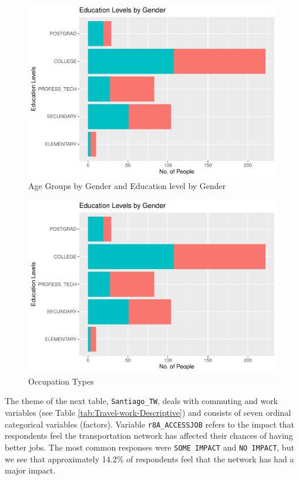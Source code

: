 \documentclass[
11pt, %
oneside, %
english, %
singlespacing, %
]{macthesis} %
\begin{document}
\begin{figure}

{\centering \includegraphics[width=0.85\linewidth]{thesis_files/figure-latex/unnamed-chunk-7-2} 

}

\caption{\label{fig:Education and age by gender}Age Groups by Gender and Education level by Gender}\label{fig:unnamed-chunk-7-2}
\end{figure}
\begin{figure}

{\centering \includegraphics[width=0.85\linewidth]{thesis_files/figure-latex/unnamed-chunk-8-1} 

}

\caption{\label{fig:Occupation type graph}Occupation Types}\label{fig:unnamed-chunk-8}
\end{figure}
The theme of the next table, \texttt{Santiago\_TW}, deals with commuting and work variables (see Table \ref{tab:Travel-work-Descriptive}) and consists of seven ordinal categorical variables (factors). Variable \texttt{r8A\_ACCESSJOB} refers to the impact that respondents feel the transportation network has affected their chances of having better jobs. The most common responses were \texttt{SOME\ IMPACT} and \texttt{NO\ IMPACT}, but we see that approximately 14.2\% of respondents feel that the network has had a major impact.
\end{document}
